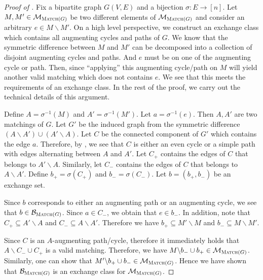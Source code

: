 \documentclass{article}
\newcommand{\junk}[1]{}
\newcommand{\M}{\mathcal M}
\newcommand{\B}{\mathcal B}
\newcommand{\del}{\backslash}
\DeclareMathOperator{\rank}{width}
\newcommand{\Match}{\textsc{Match}\xspace}
\begin{document}
\begin{proof}[Proof of ]
Fix  a bipartite graph $G(V,E)$ and a bijection $\sigma\colon E\rightarrow [n]$. 
Let $M,M' \in \M_{\Match(G)}$ be two different elements of $\M_{\Match(G)}$ and consider an arbitrary $e\in M\del M'$.
On a high level perspective, we construct an exchange class which contains all augmenting cycles and paths of $G$.
We know that the symmetric difference between $M$ and $M'$ can be decomposed into a collection of disjoint augmenting cycles and paths. 
And $e$ must be on one of the augmenting cycle or path. 
Then, since ``applying'' this augmenting cycle/path on $M$ will yield another valid matching which does not contains $e$. 
We see that this meets the requirements of an exchange class.
In the rest of the proof, we carry out the technical details of this argument.



Define $A=\sigma^{-1}(M)$ and $A'=\sigma^{-1}(M')$. 
Let $a=\sigma^{-1}(e)$.
Then $A,A'$ are two matchings of $G$. 
Let $G'$ be the induced graph from the symmetric difference $(A\del A')\cup(A'\del A)$.
Let $C$ be the connected component of $G'$ which contains the edge $a$.
Therefore, by , we see that $C$ is either an even cycle or a  simple path with edges alternating between $A$ and $A'$.
Let $C_+$ contains the edges of $C$ that belongs to $A'\del A$.
Similarly, let $C_-$ contains the edges of $C$ that belongs to $A\del A'$.
Define $b_+ = \sigma(C_+)$ and $b_-=\sigma(C_-)$.
Let $b=(b_+,b_-)$ be an exchange set.

\junk{
Now we construct the exchange class.
Let $\mathcal C$ be the set of all cycles in $G$.
Let $\mathcal P$ be the set of all paths in $G$.
We define $\B_{\Match(G)}$ to correspond to the set of all cycles and all paths of $G$ with edges alternating between $b_+$ and $b_-$.
Formally, we have
$$
\B_{\Match(G)} = \Big\{(\sigma(c_+),\sigma(c_-)) \mid \exists c\in \mathcal C\cup P,\; \text{the edges of }c\text{ alternate between } c_+,c_-\Big\}.
$$
}

Since $b$ corresponds to either an augmenting path or an augmenting cycle, 
we see that $b\in \B_{\Match(G)}$.
Since $a\in C_-$, we obtain that $e\in b_-$.
In addition, note that $C_+ \subseteq A'\del A$ and $C_- \subseteq A\del A'$.
Therefore we have $b_+ \subseteq M'\del M$ and $b_- \subseteq M\del M'$.

Since $C$ is an $A$-augmenting path/cycle, therefore it immediately holds that $A\del C_-\cup C_+$ is a valid matching.
Therefore, we have $M\del b_- \cup b_+ \in \M_{\Match(G)}$.
Similarly, one can show that $M'\del b_+ \cup b_-\in \M_{\Match(G)}$.
Hence we have shown that $\B_{\Match(G)}$ is an exchange class for $\M_{\Match(G)}$.
\end{proof}
\end{document}
